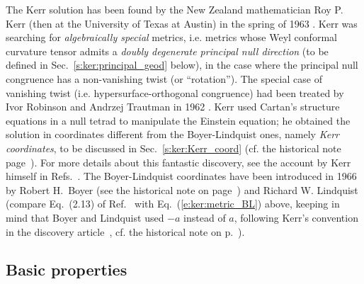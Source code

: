 \begin{hist}
The Kerr solution has been found by the New Zealand mathematician Roy P. Kerr (then at the University of Texas at Austin) in the spring of 1963
\cite{Kerr63}. Kerr was searching for \emph{algebraically special} metrics, i.e. metrics whose Weyl conformal curvature
tensor admits a \emph{doubly degenerate principal null direction} (to be defined
in Sec.~\ref{s:ker:principal_geod} below), in the case where the
principal null congruence has a non-vanishing twist (or ``rotation''). The special case of vanishing twist (i.e. hypersurface-orthogonal
congruence) had been treated by Ivor Robinson and
Andrzej Trautman in 1962 \cite{RobinT62}.
Kerr used
Cartan's structure equations in a null tetrad
to manipulate the Einstein equation; he obtained the solution in coordinates different from the Boyer-Lindquist ones, namely \emph{Kerr coordinates},
to be discussed in Sec.~\ref{s:ker:Kerr_coord} (cf. the historical note page~\pageref{h:ker:Kerr_coord}). For more details about this fantastic discovery, see the
account by Kerr himself in Refs.~\cite{Kerr09,KrasiVK09}.
The Boyer-Lindquist coordinates have been introduced in 1966 by Robert H.~Boyer (see the historical note on page~\pageref{h:sta:Boyer}) and Richard W. Lindquist \cite{BoyerL67} (compare Eq.~(2.13) of Ref.~\cite{BoyerL67} with
Eq.~(\ref{e:ker:metric_BL}) above, keeping in mind that Boyer and Lindquist used
$-a$ instead of $a$, following Kerr's convention in the discovery article~\cite{Kerr63}, cf.
the historical note on p.~\pageref{h:ker:Kerr_coord}).
\end{hist}

\subsection{Basic properties} \label{s:ker:basic_prop}

